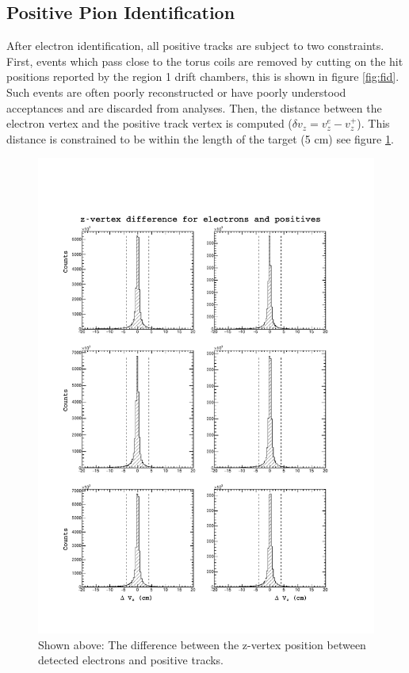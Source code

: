 \subsection{Positive Pion Identification}

After electron identification, all positive tracks are subject to two constraints.  First, events which pass close to the torus coils are removed by cutting on the hit positions reported by the region 1 drift chambers, this is shown in figure \ref{fig:fid}.  Such events are often poorly reconstructed or have poorly understood acceptances and are discarded from analyses.  Then, the distance between the electron vertex and the positive track vertex is computed ($\delta v_{z} = v_{z}^{e} - v_{z}^{+}$).  This distance is constrained to be within the length of the target (5 cm) see figure \ref{fig:dvz}.  

\begin{figure}
  \label{fig:dvz}
  \begin{center}
    \includegraphics[width=\columnwidth]{image/dvz.pdf}
    \caption{Shown above: The difference between the z-vertex position between detected electrons and positive tracks.}
  \end{center}
\end{figure}

